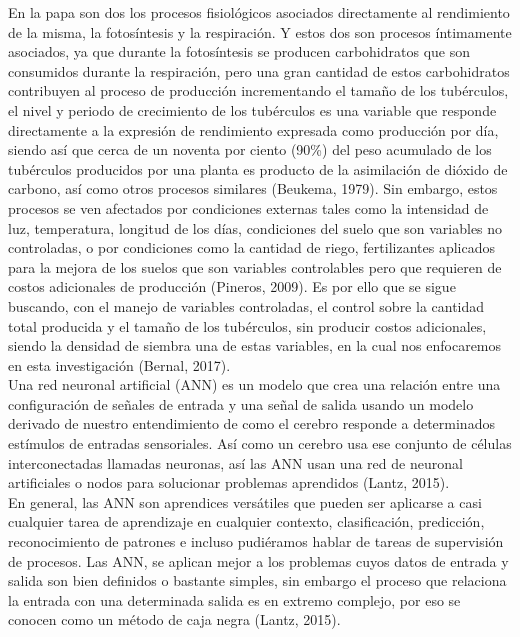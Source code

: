 En la papa son dos los procesos fisiológicos asociados directamente al rendimiento de la misma, la fotosíntesis y la respiración. Y estos dos son procesos íntimamente asociados, ya que durante la fotosíntesis se producen carbohidratos que son consumidos durante la respiración, pero una gran cantidad de estos carbohidratos contribuyen al proceso de producción incrementando el tamaño de los tubérculos, el nivel y periodo de crecimiento de los tubérculos es una variable que responde directamente a la expresión de rendimiento expresada como producción por día, siendo así que cerca de un noventa por ciento (90\%) del peso acumulado de los tubérculos producidos por una planta es producto de la asimilación de dióxido de carbono, así como otros procesos similares (Beukema, 1979). Sin embargo, estos procesos se ven afectados por condiciones externas tales como la intensidad de luz, temperatura, longitud de los días, condiciones del suelo que son variables no controladas, o por condiciones como la cantidad de riego, fertilizantes aplicados para la mejora de los suelos que son variables controlables pero que requieren de costos adicionales de producción (Pineros, 2009). Es por ello que se sigue buscando, con el manejo de variables controladas,  el control sobre la cantidad total producida y el tamaño de los tubérculos,  sin producir costos adicionales, siendo la densidad de siembra una de estas variables, en la cual nos enfocaremos en esta investigación (Bernal, 2017).\\

Una red neuronal artificial (ANN) es un modelo que crea una relación entre una configuración de señales de entrada y una señal de salida usando un modelo derivado de nuestro entendimiento de como el cerebro responde a determinados estímulos de entradas sensoriales. Así como un cerebro usa ese conjunto de células interconectadas llamadas neuronas, así las ANN usan una red de neuronal artificiales o nodos para solucionar problemas aprendidos (Lantz, 2015).\\

En general, las ANN son aprendices versátiles que pueden ser aplicarse a casi cualquier tarea de aprendizaje en cualquier contexto, clasificación, predicción, reconocimiento de patrones e incluso pudiéramos hablar de tareas de supervisión de procesos. Las ANN, se aplican mejor a los problemas cuyos datos de entrada y salida son bien definidos o bastante simples, sin embargo el proceso que relaciona la entrada con una determinada salida es en extremo complejo, por eso se conocen como un método de caja negra (Lantz, 2015).\\

